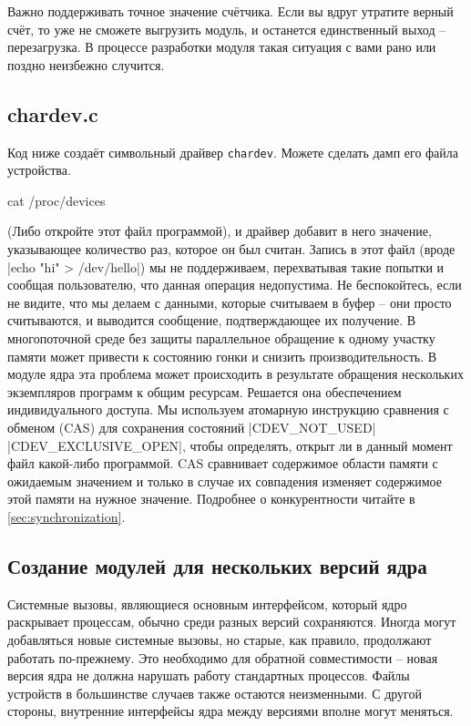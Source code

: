 \documentclass[10pt, oneside]{book}
\begin{document}
Важно поддерживать точное значение счётчика. Если вы вдруг утратите верный счёт, то уже не сможете выгрузить модуль, и останется единственный выход – перезагрузка. В процессе разработки модуля такая ситуация с вами рано или поздно неизбежно случится.

\subsection{chardev.c}
\label{sec:chardev_c}
Код ниже создаёт символьный драйвер \verb|chardev|.
Можете сделать дамп его файла устройства.

\begin{codebash}
cat /proc/devices
\end{codebash}

(Либо откройте этот файл программой), и драйвер добавит в него значение, указывающее
количество раз, которое он был считан. Запись в этот файл (вроде \sh|echo "hi" > /dev/hello|) мы не поддерживаем, перехватывая такие попытки и сообщая
пользователю, что данная операция недопустима.
Не беспокойтесь, если не видите, что мы делаем с данными, которые считываем в буфер – они просто считываются, и выводится сообщение, подтверждающее их получение. В многопоточной среде без защиты параллельное обращение к одному участку памяти может привести к состоянию гонки и снизить производительность. В модуле ядра эта проблема может происходить в результате обращения нескольких экземпляров программ к общим ресурсам.
Решается она обеспечением индивидуального доступа. Мы используем атомарную инструкцию сравнения с обменом (CAS) для сохранения состояний  \cpp|CDEV_NOT_USED| \cpp|CDEV_EXCLUSIVE_OPEN|, чтобы определять, открыт ли в данный момент файл какой-либо
программой. CAS сравнивает содержимое области памяти с ожидаемым значением и
только в случае их совпадения изменяет содержимое этой памяти на нужное значение.
Подробнее о конкурентности читайте в \ref{sec:synchronization}.


\subsection{Создание модулей для нескольких версий ядра}
\label{sec:modules_for_versions}
Системные вызовы, являющиеся основным интерфейсом, который ядро раскрывает процессам, обычно среди разных версий сохраняются. Иногда могут добавляться новые системные вызовы, но старые, как правило, продолжают работать по-прежнему. Это необходимо для обратной совместимости – новая версия ядра не должна нарушать работу стандартных процессов. Файлы устройств в большинстве случаев также остаются неизменными. С другой стороны, внутренние интерфейсы ядра между версиями вполне могут меняться.
\end{document}
